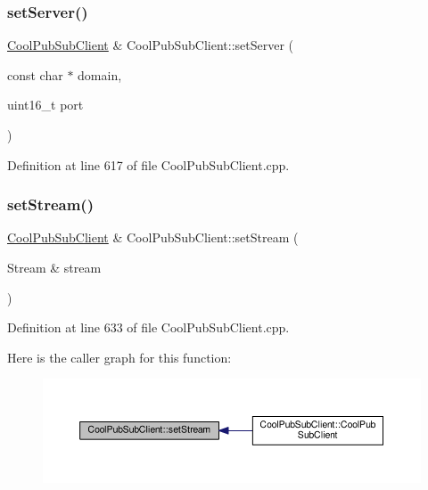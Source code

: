 \subsubsection{\texorpdfstring{set\+Server()}{setServer()}\hspace{0.1cm}{\footnotesize\ttfamily [3/3]}}
{\footnotesize\ttfamily \hyperlink{class_cool_pub_sub_client}{Cool\+Pub\+Sub\+Client} \& Cool\+Pub\+Sub\+Client\+::set\+Server (\begin{DoxyParamCaption}\item[{const char $\ast$}]{domain,  }\item[{uint16\+\_\+t}]{port }\end{DoxyParamCaption})}



Definition at line 617 of file Cool\+Pub\+Sub\+Client.\+cpp.

\mbox{\label{class_cool_pub_sub_client_ae97e40823ea689ff9e36d5bdd71bb933}} 
\subsubsection{\texorpdfstring{set\+Stream()}{setStream()}}
{\footnotesize\ttfamily \hyperlink{class_cool_pub_sub_client}{Cool\+Pub\+Sub\+Client} \& Cool\+Pub\+Sub\+Client\+::set\+Stream (\begin{DoxyParamCaption}\item[{Stream \&}]{stream }\end{DoxyParamCaption})}



Definition at line 633 of file Cool\+Pub\+Sub\+Client.\+cpp.

Here is the caller graph for this function\+:
\nopagebreak
\begin{figure}[H]
\begin{center}
\leavevmode
\includegraphics[width=350pt]{class_cool_pub_sub_client_ae97e40823ea689ff9e36d5bdd71bb933_icgraph}
\end{center}
\end{figure}
\mbox{\label{class_cool_pub_sub_client_a2276c7e52531b597b4342fadf3722f43}} 
